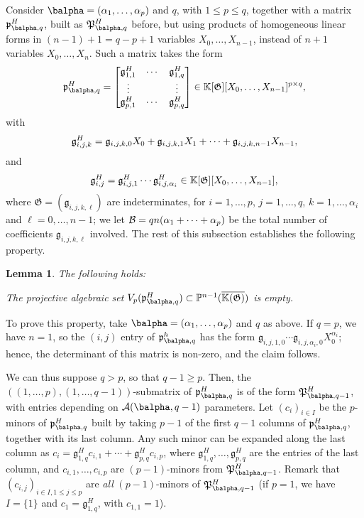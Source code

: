 \documentclass[12pt]{article}
\newtheorem{lemma}[definition]{Lemma}
\begin{document}
Consider $\balpha=(\alpha_1,\dots,\alpha_p)$ and
$q$, with $1 \le p \le q$, together with a matrix
$\mathfrak{p}^H_{\balpha,q}$, built as $\mathfrak{P}^H_{\balpha,q}$
before, but using products of homogeneous linear forms in $(n-1)+1=q-p+1$
variables $X_0,\dots,X_{n-1}$, instead of $n+1$ variables
$X_0,\dots,X_n$. Such a matrix takes the form
\begin{align}\label{eq:matM2}
\mathfrak{p}^H_{\balpha,q}=\left [\begin{matrix}
\mathfrak{g}^H_{1,1} & \cdots & \mathfrak{g}^H_{1,q}\\
 \vdots & & \vdots\\
\mathfrak{g}^H_{p,1} & \cdots & \mathfrak{g}^H_{p,q}
  \end{matrix}\right ]\in \KK[\mathfrak{G}][X_0,\dots,X_{n-1}]^{p\times q},
\end{align}
with 
$$\mathfrak{g}^H_{i,j,k} = \frak{g}_{i,j,k,0}X_0 + \frak{g}_{i,j,k,1} X_1 +\cdots + \frak{g}_{i,j,k,n-1} X_{n-1},$$
and
$$\mathfrak{g}^H_{i,j} = \mathfrak{g}^H_{i,j,1} \cdots
\mathfrak{g}^H_{i,j,\alpha_i} \in
\mathbb{K}[\mathfrak{G}][X_0,\dots,X_{n-1}],$$ where
$\mathfrak{G}=(\mathfrak{g}_{i,j,k,\ell})$ are indeterminates, for
$i=1,\dots,p$, $j=1,\dots,q$, $k=1,\dots,\alpha_i$ and
$\ell=0,\dots,n-1$; we let ${\cal B}=q n (\alpha_1+\cdots +\alpha_p)$
be the total number of coefficients $\mathfrak{g}_{i,j,k,\ell}$
involved. The rest of this subsection establishes the following property.

\begin{lemma}
The following holds:
\begin{description}[leftmargin=*]
\item[$\assI_3(\balpha,q).$] The projective algebraic set
  $V_p(\mathfrak{p}^H_{\balpha,q}) \subset \P^{n-1}(\KKCbar)$ is empty.
\end{description}
\end{lemma}
To prove this property, take $\balpha=(\alpha_1,\dots,\alpha_p)$ and
$q$ as above. If $q=p$, we have $n=1$, so the $(i,j)$ entry of
$\mathfrak{p}^h_{\balpha,q}$ has the form
$\mathfrak{g}_{i,j,1,0}\cdots\mathfrak{g}_{i,j,\alpha_i,0}
X_0^{\alpha_i}$; hence, the determinant of this matrix is non-zero,
and the claim follows.

We can thus suppose $q > p$, so that $q-1 \ge p$.  Then, the
$((1,\dots,p),(1,\dots,q-1))$-submatrix of $\mathfrak{p}^H_{\balpha,q}$ is
of the form $\mathfrak{P}^H_{\balpha,q-1}$, with entries depending on
${\cal A}(\balpha,q-1)$ parameters.  Let $(c_i)_{i \in I}$ be the $p$-minors
of $\mathfrak{p}^H_{\balpha,q}$ built by taking $p-1$ of the first $q-1$
columns of $\mathfrak{p}^H_{\balpha,q}$, together with its last column.
Any such minor can be expanded along the last column as $c_i =
\mathfrak{g}^H_{1,q} c_{i,1} + \cdots + \mathfrak{g}^H_{p,q}
c_{i,p}$, where $\mathfrak{g}^H_{1,q},\dots,\mathfrak{g}^H_{p,q}$ are
the entries of the last column, and $c_{i,1},\dots,c_{i,p}$
are $(p-1)$-minors from $\mathfrak{P}^H_{\balpha,q-1}$. Remark that
$(c_{i,j})_{i \in I, 1 \le j \le p}$ are {\em all} $(p-1)$-minors
of $\mathfrak{P}^H_{\balpha,q-1}$ (if $p=1$, we have $I=\{1\}$ and
$c_1=\mathfrak{g}^H_{1,q}$, with $c_{1,1}=1$).
\end{document}

